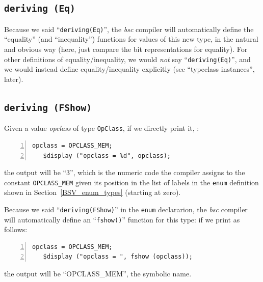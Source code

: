 
\subsection{{\tt deriving (Eq)}}


Because we said ``\verb|deriving(Eq)|'', the \emph{bsc} compiler will
automatically define the ``equality'' (and ``inequality'') functions
for values of this new type, in the natural and obvious way (here,
just compare the bit representations for equality).  For other
definitions of equality/inequality, we would \emph{not} say
``\verb|deriving(Eq)|'', and we would instead define
equality/inequality explicitly (see ``typeclass instances'', later).


\subsection{{\tt deriving (FShow)}}


Given a value \emph{opclass} of type \verb|OpClass|, if we directly
print it, {\eg}:

{\footnotesize
\begin{Verbatim}[frame=single, numbers=left]
   opclass = OPCLASS_MEM;
   $display ("opclass = %d", opclass);
\end{Verbatim}
}

the output will be ``3'', which is the numeric code the compiler
assigns to the constant \verb|OPCLASS_MEM| given its position in the
list of labels in the \verb|enum| definition shown in
Section~\ref{BSV_enum_types} (starting at zero).

Because we said ``\verb|deriving(FShow)|'' in the \verb|enum|
declararion, the \emph{bsc} compiler will automatically define an
``\verb|fshow()|'' function for this type: if we print as follows:

{\footnotesize
\begin{Verbatim}[frame=single, numbers=left]
   opclass = OPCLASS_MEM;
   $display ("opclass = ", fshow (opclass));
\end{Verbatim}
}

the output will be ``OPCLASS\_MEM'', {\ie} the symbolic name.

